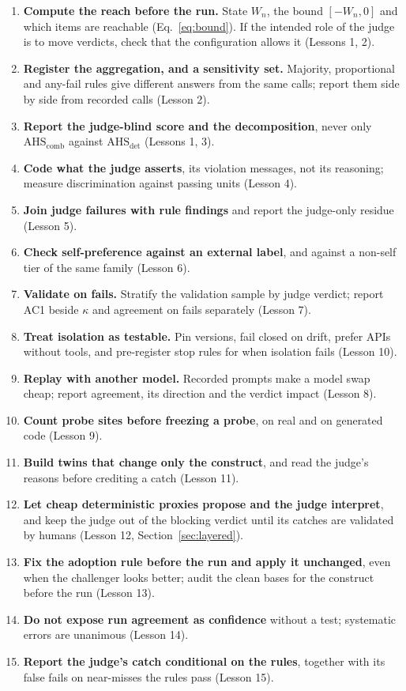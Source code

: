 \documentclass[10pt,a4paper]{article}
\newcommand{\Wn}{W_n}
\newcommand{\ahs}[1]{\mathrm{AHS}_{\mathrm{#1}}}
\begin{document}
\begin{enumerate}[leftmargin=*]
  \item \textbf{Compute the reach before the run.} State $\Wn$, the bound $[-\Wn, 0]$ and which items are reachable
        (Eq.~\ref{eq:bound}). If the intended role of the judge is to move verdicts, check that the configuration
        allows it (Lessons 1, 2).
  \item \textbf{Register the aggregation, and a sensitivity set.} Majority, proportional and any-fail rules give
        different answers from the same calls; report them side by side from recorded calls (Lesson 2).
  \item \textbf{Report the judge-blind score and the decomposition}, never only $\ahs{comb}$ against $\ahs{det}$
        (Lessons 1, 3).
  \item \textbf{Code what the judge asserts}, its violation messages, not its reasoning; measure discrimination
        against passing units (Lesson 4).
  \item \textbf{Join judge failures with rule findings} and report the judge-only residue (Lesson 5).
  \item \textbf{Check self-preference against an external label}, and against a non-self tier of the same family
        (Lesson 6).
  \item \textbf{Validate on fails.} Stratify the validation sample by judge verdict; report AC1 beside $\kappa$ and
        agreement on fails separately (Lesson 7).
  \item \textbf{Treat isolation as testable.} Pin versions, fail closed on drift, prefer APIs without tools, and
        pre-register stop rules for when isolation fails (Lesson 10).
  \item \textbf{Replay with another model.} Recorded prompts make a model swap cheap; report agreement, its
        direction and the verdict impact (Lesson 8).
  \item \textbf{Count probe sites before freezing a probe}, on real and on generated code (Lesson 9).
  \item \textbf{Build twins that change only the construct}, and read the judge's reasons before crediting a catch
        (Lesson 11).
  \item \textbf{Let cheap deterministic proxies propose and the judge interpret}, and keep the judge out of the
        blocking verdict until its catches are validated by humans (Lesson 12, Section~\ref{sec:layered}).
  \item \textbf{Fix the adoption rule before the run and apply it unchanged}, even when the challenger looks
        better; audit the clean bases for the construct before the run (Lesson 13).
  \item \textbf{Do not expose run agreement as confidence} without a test; systematic errors are unanimous
        (Lesson 14).
  \item \textbf{Report the judge's catch conditional on the rules}, together with its false fails on near-misses the
        rules pass (Lesson 15).
\end{enumerate}
\end{document}

